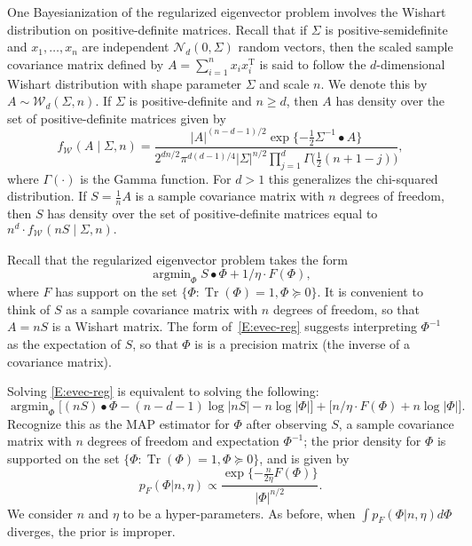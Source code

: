 \documentclass[11pt]{article}
\newcommand{\trans}{\mathrm{T}}
\DeclareMathOperator*{\Tr}{Tr}
\newcommand{\Normal}[1][]{\mathcal{N}_{#1}}
\newcommand{\Wishart}[1][]{\mathcal{W}_{#1}}
\DeclareMathOperator*{\argmin}{argmin}
\begin{document}
One Bayesianization of the regularized eigenvector problem involves the Wishart
distribution on positive-definite matrices.  Recall that if $\Sigma$ is
positive-semidefinite and $x_1, \ldots, x_n$ are independent
$\Normal[d](0, \Sigma)$ random vectors, then the scaled sample covariance matrix
defined by $A = \sum_{i=1}^n x_i x_i^\trans$ is said to follow the $d$-dimensional
Wishart distribution with shape parameter $\Sigma$ and scale $n$.  We denote
this by $A \sim \Wishart[d](\Sigma, n)$.  If $\Sigma$ is positive-definite and $n \geq d$, then
$A$ has density over the set of positive-definite matrices given by
\[
    f_{\Wishart}(A \mid \Sigma, n)
    =
    \frac{
        |A|^{(n-d-1)/2} \exp\{-\tfrac{1}{2} \Sigma^{-1} \bullet A \}
    }{
        2^{dn/2} \pi^{d(d-1)/4}
        |\Sigma|^{n/2}
        \prod_{j=1}^{d} \Gamma\big(\tfrac{1}{2} (n + 1 - j)\big)
    },
\]
where $\Gamma(\cdot)$ is the Gamma function.  For $d > 1$ this generalizes the
chi-squared distribution.  If $S = \tfrac{1}{n} A$ is a sample covariance matrix
with $n$ degrees of freedom, then $S$ has density over the set of
positive-definite matrices equal to
\(
    n^d \cdot f_{\Wishart}(n S \mid \Sigma, n).
\)

Recall that the regularized eigenvector problem takes the form
\begin{equation}\label{E:evec-reg}
    \argmin_{\Phi}
        S \bullet \Phi
        +
        1/\eta \cdot F(\Phi),
\end{equation}
where $F$ has support on the set 
\(
    \{ \Phi : \Tr(\Phi) = 1, \Phi \succeq 0 \}.
\)
It is convenient to think of $S$ as a sample covariance matrix with $n$ degrees
of freedom, so that $A = n S$ is a Wishart matrix.
The form of~\eqref{E:evec-reg} suggests interpreting $\Phi^{-1}$ as the
expectation of $S$, so that $\Phi$ is is a precision matrix
(the inverse of a covariance matrix).

Solving \eqref{E:evec-reg} is equivalent to solving the following:
\begin{equation*}
    \argmin_{\Phi}
        \big[
            (n S) \bullet \Phi
            -
            (n-d-1) \log |n S|
            -
            n \log |\Phi|
        \big]
        +
        \big[
            n/\eta \cdot F(\Phi)
            +
            n \log |\Phi|
        \big].
\end{equation*}
Recognize this as the MAP estimator for $\Phi$ after observing $S$, a 
sample covariance matrix with $n$ degrees of freedom and expectation
$\Phi^{-1}$; the prior density for $\Phi$ is supported on the
set $\{ \Phi : \Tr(\Phi) = 1, \Phi \succeq 0\}$, and is given by
\begin{equation}\label{E:prior-phi}
    p_{F}(\Phi | n, \eta)
        \propto
        \frac{
            \exp\{-\tfrac{n}{2\eta} F(\Phi) \}
        }{
            |\Phi|^{n/2}
        }.
\end{equation}
We consider $n$ and $\eta$ to be a hyper-parameters.  As before, when
$\int p_{F}(\Phi | n, \eta) d\Phi$ diverges, the prior is improper.
\end{document}
